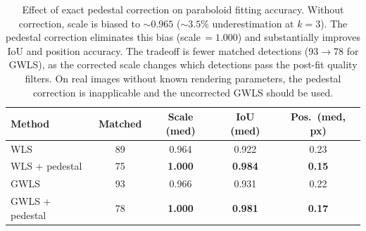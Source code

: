 \documentclass[11pt]{article}
\begin{document}
\begin{table}[h]
\centering
\begin{tabular}{@{}lcccc@{}}
\toprule
Method & Matched & Scale (med) & IoU (med) & Pos.\ (med, px) \\
\midrule
WLS              & 89 & 0.964 & 0.922 & 0.23 \\
WLS + pedestal   & 75 & \textbf{1.000} & \textbf{0.984} & \textbf{0.15} \\
GWLS             & 93 & 0.966 & 0.931 & 0.22 \\
GWLS + pedestal  & 78 & \textbf{1.000} & \textbf{0.981} & \textbf{0.17} \\
\bottomrule
\end{tabular}
\caption{Effect of exact pedestal correction on paraboloid fitting
accuracy.  Without correction, scale is biased to $\sim\!0.965$
($\sim\!3.5\%$ underestimation at $k=3$).  The pedestal correction
eliminates this bias (scale$\,=1.000$) and substantially improves IoU
and position accuracy.  The tradeoff is fewer matched detections
(93$\to$78 for GWLS), as the corrected scale changes which detections
pass the post-fit quality filters.  On real images without known
rendering parameters, the pedestal correction is inapplicable and the
uncorrected GWLS should be used.}
\label{tab:pedestal-results}
\end{table}
\end{document}
